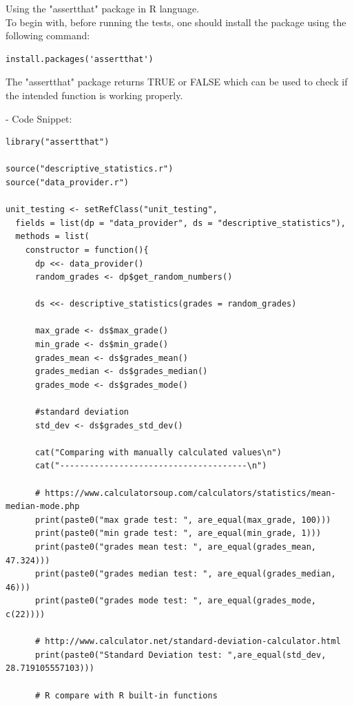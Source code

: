 \documentclass[11pt]{article}
\begin{document}
Using the "assertthat" package in R language.\\

To begin with, before running the tests, one should install the package using the following command:

\begin{lstlisting}
install.packages('assertthat')
\end{lstlisting}

The "assertthat" package returns TRUE or FALSE which can be used to check if the intended function is working properly.

- Code Snippet:\\

\begin{lstlisting}
library("assertthat")

source("descriptive_statistics.r")
source("data_provider.r")

unit_testing <- setRefClass("unit_testing",
  fields = list(dp = "data_provider", ds = "descriptive_statistics"),
  methods = list(
    constructor = function(){
      dp <<- data_provider()
      random_grades <- dp$get_random_numbers()
      
      ds <<- descriptive_statistics(grades = random_grades)
      
      max_grade <- ds$max_grade()
      min_grade <- ds$min_grade()
      grades_mean <- ds$grades_mean()
      grades_median <- ds$grades_median()
      grades_mode <- ds$grades_mode()
      
      #standard deviation
      std_dev <- ds$grades_std_dev()
      
      cat("Comparing with manually calculated values\n")
      cat("--------------------------------------\n")
      
      # https://www.calculatorsoup.com/calculators/statistics/mean-median-mode.php
      print(paste0("max grade test: ", are_equal(max_grade, 100)))
      print(paste0("min grade test: ", are_equal(min_grade, 1)))
      print(paste0("grades mean test: ", are_equal(grades_mean, 47.324)))
      print(paste0("grades median test: ", are_equal(grades_median, 46)))
      print(paste0("grades mode test: ", are_equal(grades_mode, c(22))))
      
      # http://www.calculator.net/standard-deviation-calculator.html
      print(paste0("Standard Deviation test: ",are_equal(std_dev, 28.719105557103)))
      
      # R compare with R built-in functions
      

\end{lstlisting}
\end{document}

